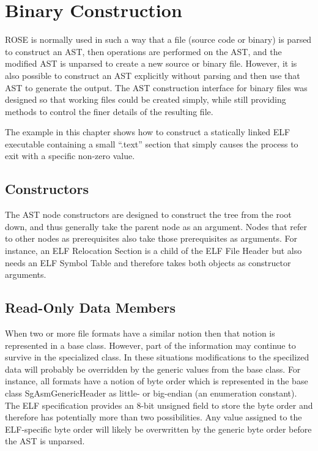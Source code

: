 \chapter{Binary Construction}

ROSE is normally used in such a way that a file (source code or
binary) is parsed to construct an AST, then operations are performed
on the AST, and the modified AST is unparsed to create a new source or
binary file.  However, it is also possible to construct an AST
explicitly without parsing and then use that AST to generate the
output.  The AST construction interface for binary files was designed
so that working files could be created simply, while still providing
methods to control the finer details of the resulting file.

The example in this chapter shows how to construct a statically linked
ELF executable containing a small ``.text'' section that simply causes
the process to exit with a specific non-zero value.

\section{Constructors}

The AST node constructors are designed to construct the tree from the
root down, and thus generally take the parent node as an
argument. Nodes that refer to other nodes as prerequisites also take
those prerequisites as arguments. For instance, an ELF Relocation
Section is a child of the ELF File Header but also needs an ELF Symbol
Table and therefore takes both objects as constructor arguments.

\section{Read-Only Data Members}

When two or more file formats have a similar notion then that notion
is represented in a base class. However, part of the information may
continue to survive in the specialized class. In these situations
modifications to the specilized data will probably be overridden by
the generic values from the base class.  For instance, all formats
have a notion of byte order which is represented in the base class
SgAsmGenericHeader as little- or big-endian (an enumeration
constant). The ELF specification provides an 8-bit unsigned field to
store the byte order and therefore has potentially more than two
possibilities. Any value assigned to the ELF-specific byte order will
likely be overwritten by the generic byte order before the AST is
unparsed.

